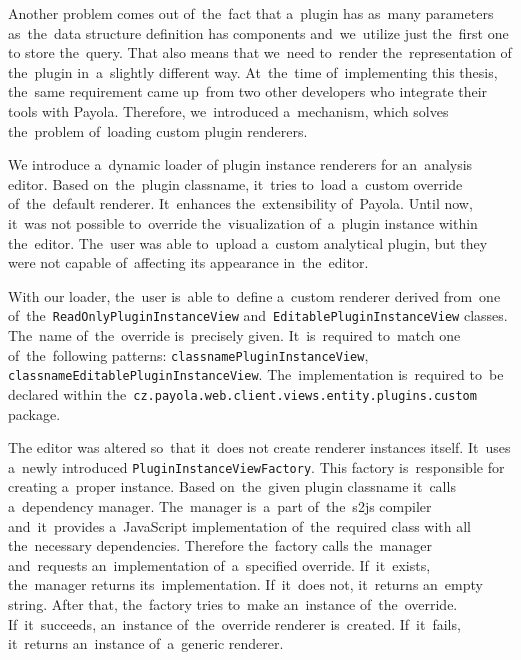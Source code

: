 Another problem comes out of~the~fact that a~plugin has as~many parameters as~the~data structure definition has components and~we~utilize just the~first one 
to store the~query. That also means that we~need to~render the~representation 
of the~plugin in~a~slightly different way. At~the~time of~implementing this 
thesis, the~same requirement came up~from two other developers who integrate their 
tools with Payola. Therefore, we~introduced a~mechanism, which solves the~problem of~loading custom plugin renderers.

We introduce a~dynamic loader of plugin instance renderers for an~analysis editor. 
Based on~the~plugin classname, it~tries to~load a~custom override of~the~default 
renderer. It~enhances the~extensibility of~Payola. Until now, it~was not 
possible to~override the~visualization of~a~plugin instance within the~editor. The~user was able to~upload a~custom analytical plugin, but they were not capable of~affecting its
appearance in~the~editor.

\begin{sloppypar}
With our loader, the~user is~able to~define a~custom renderer derived from~one of~the~\texttt{ReadOnlyPluginInstanceView} and~\texttt{EditablePluginInstanceView} 
classes. The~name of~the~override is~precisely given. It~is~required to~match one 
of~the~following patterns: \texttt{{classname}PluginInstanceView},
\texttt{{classname}EditablePluginInstanceView}. The~implementation is~required
to~be declared within the~\texttt{cz.payola.web.client.views.entity.plugins.custom} package.
\end{sloppypar}

\begin{sloppypar}
The editor was altered so~that it~does not create renderer instances itself. It~uses a~newly introduced \texttt{PluginInstanceViewFactory}. This 
factory is~responsible for creating a~proper instance. Based on~the~given plugin 
classname it~calls a~dependency manager. The~manager is~a~part of~the~s2js compiler and~it~provides a~JavaScript implementation of~the~required class
with all the~necessary dependencies. Therefore the~factory calls the~manager and~requests an~implementation of~a~specified override. If~it~exists, the~manager 
returns its~implementation. If~it~does not, it~returns an~empty string. After 
that, the~factory tries to~make an~instance of~the~override. If~it~succeeds, an~instance of~the~override renderer is~created. If~it~fails, it~returns an~instance of~a~generic renderer. 
\end{sloppypar}
 
